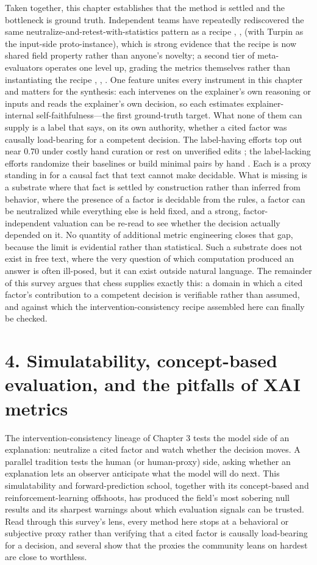 \documentclass[conference]{IEEEtran}
\begin{document}
Taken together, this chapter establishes that the method is settled and the bottleneck is ground truth. Independent teams have repeatedly rediscovered the same neutralize-and-retest-with-statistics pattern as a recipe \cite{ref29}, \cite{ref16}, \cite{ref17} (with Turpin \cite{ref28} as the input-side proto-instance), which is strong evidence that the recipe is now shared field property rather than anyone's novelty; a second tier of meta-evaluators operates one level up, grading the metrics themselves rather than instantiating the recipe \cite{ref14}, \cite{ref15}, \cite{ref44}. One feature unites every instrument in this chapter and matters for the synthesis: each intervenes on the explainer's own reasoning or inputs and reads the explainer's own decision, so each estimates explainer-internal self-faithfulness---the first ground-truth target. What none of them can supply is a label that says, on its own authority, whether a cited factor was causally load-bearing for a competent decision. The label-having efforts top out near 0.70 under costly hand curation \cite{ref14} or rest on unverified edits \cite{ref15}; the label-lacking efforts randomize their baselines \cite{ref17} or build minimal pairs by hand \cite{ref44}. Each is a proxy standing in for a causal fact that text cannot make decidable. What is missing is a substrate where that fact is settled by construction rather than inferred from behavior, where the presence of a factor is decidable from the rules, a factor can be neutralized while everything else is held fixed, and a strong, factor-independent valuation can be re-read to see whether the decision actually depended on it. No quantity of additional metric engineering closes that gap, because the limit is evidential rather than statistical. Such a substrate does not exist in free text, where the very question of which computation produced an answer is often ill-posed, but it can exist outside natural language. The remainder of this survey argues that chess supplies exactly this: a domain in which a cited factor's contribution to a competent decision is verifiable rather than assumed, and against which the intervention-consistency recipe assembled here can finally be checked.

\section*{4. Simulatability, concept-based evaluation, and the pitfalls of XAI metrics}
The intervention-consistency lineage of Chapter 3 tests the model side of an explanation: neutralize a cited factor and watch whether the decision moves. A parallel tradition tests the human (or human-proxy) side, asking whether an explanation lets an observer anticipate what the model will do next. This simulatability and forward-prediction school, together with its concept-based and reinforcement-learning offshoots, has produced the field's most sobering null results and its sharpest warnings about which evaluation signals can be trusted. Read through this survey's lens, every method here stops at a behavioral or subjective proxy rather than verifying that a cited factor is causally load-bearing for a decision, and several show that the proxies the community leans on hardest are close to worthless.
\end{document}
